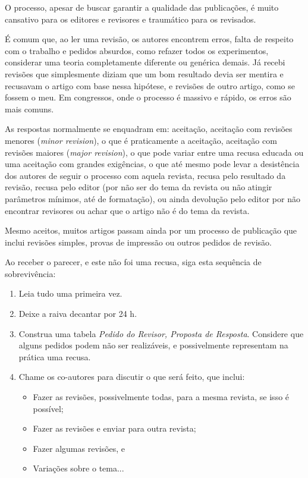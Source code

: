 O processo, apesar de buscar garantir a qualidade das publicações, é muito cansativo para os editores e revisores e traumático para os revisados. 

É comum que, ao ler uma revisão, os autores encontrem erros, falta de respeito com o trabalho e pedidos absurdos, como refazer todos os experimentos, considerar uma teoria completamente diferente ou genérica demais. 
Já recebi revisões que simplesmente diziam que um bom resultado devia ser mentira e recusavam o artigo com base nessa hipótese, e revisões de outro artigo, como se fossem o meu. Em congressos, onde o processo é massivo e rápido, os erros são mais comuns.

As respostas normalmente se enquadram em: aceitação, aceitação com revisões menores (\textit{minor revision}), o que é praticamente a aceitação, aceitação com revisões maiores (\textit{major revision}), o que pode variar entre uma recusa educada ou uma aceitação com grandes exigências, o que até mesmo pode levar a desistência dos autores de seguir o processo com aquela revista, recusa pelo resultado da revisão, recusa pelo editor (por não ser do tema da revista ou não atingir parâmetros mínimos, até de formatação), ou ainda devolução pelo editor por não encontrar revisores ou achar que o artigo não é do tema da revista.

Mesmo aceitos, muitos artigos passam ainda por um processo de publicação que inclui revisões simples, provas de impressão ou outros pedidos de revisão.

Ao receber o parecer, e este não foi uma recusa, siga esta sequência de sobrevivência:

\begin{enumerate}
  \item Leia tudo uma primeira vez.  
  \item Deixe a raiva decantar por 24 h.  
  \item Construa uma tabela \textit{Pedido do Revisor, Proposta de Resposta}. Considere que alguns pedidos podem não ser realizáveis, e possivelmente representam na prática uma recusa. 
  \item Chame os co-autores para discutir o que será feito, que inclui:
  \begin{itemize}
      \item Fazer as revisões, possivelmente todas,  para a mesma revista, se isso é possível;
      \item Fazer as revisões e enviar para outra revista;
      \item Fazer algumas revisões, e
      \item Variações sobre o tema...
  \end{itemize}
\end{enumerate}

